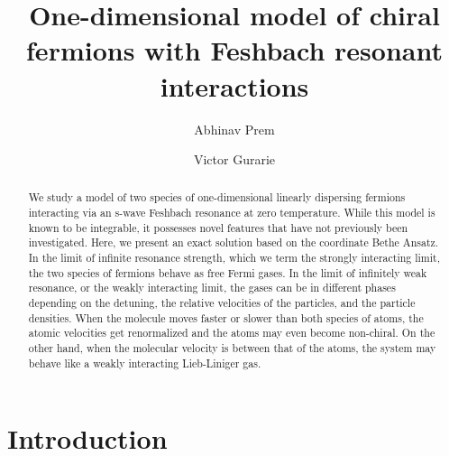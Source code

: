 \documentclass[aps,pra,
superscriptaddress,
reprint,twocolumn,preprintnumbers,
amsmath,amssymb,
nofootinbib]{revtex4-1}
\begin{document}
\graphicspath{{./Figures/}}


\title{One-dimensional model of chiral fermions with Feshbach resonant interactions}%

\author{Abhinav Prem}
\author{Victor Gurarie}

\begin{abstract}
We study a model of two species of one-dimensional linearly dispersing fermions interacting via an s-wave Feshbach resonance at zero temperature. While this model is known to be integrable, it possesses novel features that have not previously been investigated. Here, we present an exact solution based on the coordinate Bethe Ansatz.
In the limit of infinite resonance strength, which we term the strongly interacting limit, the two species of fermions behave as free Fermi gases. In the limit of infinitely weak resonance, or the weakly interacting limit, the gases can be in different phases depending on the detuning, the relative velocities of the particles, and the particle densities. When the molecule moves faster or slower than both species of atoms, the atomic velocities get renormalized and the atoms may even become non-chiral. On the other hand, when the molecular velocity is between that of the atoms, the system may behave like %
a weakly interacting Lieb-Liniger gas. 

\end{abstract}

\maketitle


	\section{Introduction}
	\label{intro}
	
\end{document}
